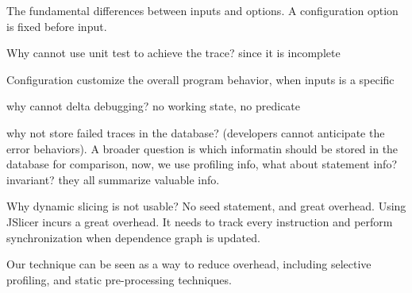 The fundamental differences between inputs and options. A configuration
option is fixed before input.

Why cannot use unit test to achieve the trace? since it is incomplete

Configuration customize the overall program behavior, when inputs is a specific

why cannot delta debugging? no working state, no predicate

why not store failed traces in the database? (developers
cannot anticipate the error behaviors). A broader question is which
informatin should be stored in the database for comparison, now, we use
profiling info, what about statement info? invariant? they all
summarize valuable info.

Why dynamic slicing is not usable? No seed statement, and great overhead. Using JSlicer incurs
a great overhead. It needs to track every instruction and
perform synchronization when dependence graph is updated.

Our technique can be seen as a way to reduce overhead,
including selective profiling, and static pre-processing
techniques.

